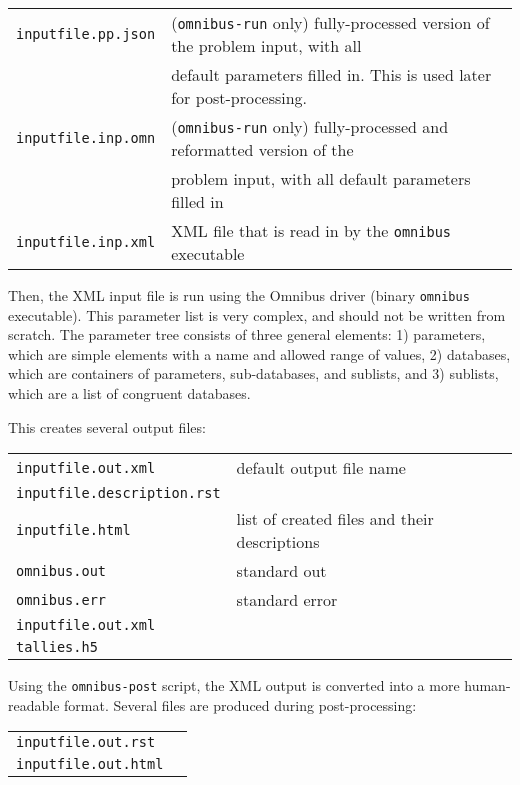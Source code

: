 \documentclass[10pt]{article}
\begin{document}
\begin{tabular}{l l}
\texttt{inputfile.pp.json} & (\texttt{omnibus-run} only) fully-processed version of the problem input, with all\\
& default parameters filled in. This is used later for post-processing.\\
\texttt{inputfile.inp.omn} & (\texttt{omnibus-run} only) fully-processed and reformatted version of the \\
& problem input, with all default parameters filled in\\
\texttt{inputfile.inp.xml} & XML file that is read in by the \texttt{omnibus} executable\\
\end{tabular}\newline

Then, the XML input file is run using the Omnibus driver (binary \texttt{omnibus} executable). This parameter list is very complex, and should not be written from scratch. The parameter tree consists of three general elements: 1) parameters, which are simple elements with a name and allowed range of values, 2) databases, which are containers of parameters, sub-databases, and sublists, and 3) sublists, which are a list of congruent databases. 

This creates several output files:\newline

\begin{tabular}{l l}
\texttt{inputfile.out.xml} & default output file name\\
\texttt{inputfile.description.rst} & \\
\texttt{inputfile.html} & list of created files and their descriptions\\
\texttt{omnibus.out} & standard out\\
\texttt{omnibus.err} & standard error\\
\texttt{inputfile.out.xml} & \\
\texttt{tallies.h5} & \\
\end{tabular}\newline

Using the \texttt{omnibus-post} script, the XML output is converted into a more human-readable format. Several files are produced during post-processing:\newline

\begin{tabular}{l l}
\texttt{inputfile.out.rst} & \\
\texttt{inputfile.out.html} & \\
\end{tabular}\newline
\end{document}
